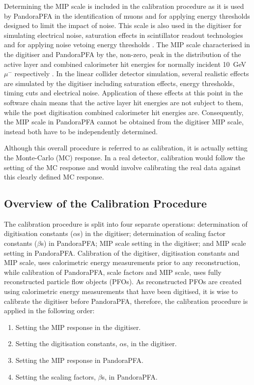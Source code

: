 Determining the MIP scale is included in the calibration procedure as it is used by PandoraPFA in the identification of muons and for applying energy thresholds designed to limit the impact of noise.  This scale is also used in the digitiser for simulating electrical noise, saturation effects in scintillator readout technologies and for applying noise vetoing energy thresholds \cite{Hartbrich:292251}.  The MIP scale characterised in the digitiser and PandoraPFA by the, non-zero, peak in the distribution of the active layer and combined calorimeter hit energies for normally incident 10~GeV $\mu^{-}$ respectively \cite{Bichsel:2004ej}.  In the linear collider detector simulation, several realistic effects are simulated by the digitiser including saturation effects, energy thresholds, timing cuts and electrical noise.  Application of these effects at this point in the software chain means that the active layer hit energies are not subject to them, while the post digitisation combined calorimeter hit energies are.  Consequently, the MIP scale in PandoraPFA cannot be obtained from the digitiser MIP scale, instead both have to be independently determined.   

Although this overall procedure is referred to as calibration, it is actually setting the Monte-Carlo (MC) response.  In a real detector, calibration would follow the setting of the MC response and would involve calibrating the real data against this clearly defined MC response.  


\subsection{Overview of the Calibration Procedure}
\label{sec:ordercalibration}
The calibration procedure is split into four separate operations: determination of digitisation constants ($\alpha$s) in the digitiser; determination of scaling factor constants ($\beta$s) in PandoraPFA; MIP scale setting in the digitiser; and MIP scale setting in PandoraPFA.  Calibration of the digitiser, digitisation constants and MIP scale, uses calorimetric energy measurements prior to any reconstruction, while calibration of PandoraPFA, scale factors and MIP scale, uses fully reconstructed particle flow objects (PFOs).  As reconstructed PFOs are created using calorimetric energy measurements that have been digitised, it is wise to calibrate the digitiser before PandoraPFA, therefore, the calibration procedure is applied in the following order:
\begin{enumerate} 
\item Setting the MIP response in the digitiser.  
\item Setting the digitisation constants, $\alpha$s, in the digitiser.  
\item Setting the MIP response in PandoraPFA.  
\item Setting the scaling factors, $\beta$s, in PandoraPFA.  
\end{enumerate} 

